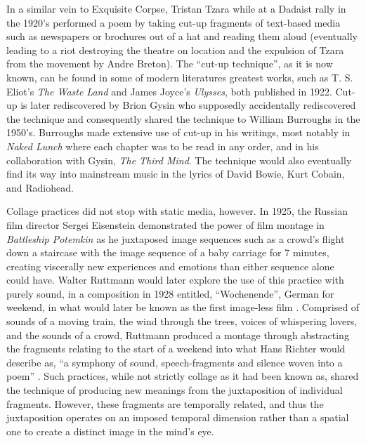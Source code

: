 \documentclass[a4paper,10pt,final]{ThesisStyle}
\begin{document}
In a similar vein to Exquisite Corpse, Tristan Tzara while at a Dadaist rally in the 1920's performed a poem by taking cut-up fragments of text-based media such as newspapers or brochures out of a hat and reading them aloud (eventually leading to a riot destroying the theatre on location and the expulsion of Tzara from the movement by Andre Breton).  The ``cut-up technique'', as it is now known, can be found in some of modern literatures greatest works, such as T. S. Eliot's \textit{The Waste Land} and James Joyce's \textit{Ulysses}, both published in 1922.  Cut-up is later rediscovered by Brion Gysin who supposedly accidentally rediscovered the technique and consequently shared the technique to William Burroughs in the 1950's.  Burroughs made extensive use of cut-up in his writings, most notably in \textit{Naked Lunch} where each chapter was to be read in any order, and in his collaboration with Gysin, \textit{The Third Mind}.  The technique would also eventually find its way into mainstream music in the lyrics of David Bowie, Kurt Cobain, and Radiohead.  %

Collage practices did not stop with static media, however.  In 1925, the Russian film director Sergei Eisenstein demonstrated the power of film montage in \textit{Battleship Potemkin} as he juxtaposed image sequences such as a crowd's flight down a staircase with the image sequence of a baby carriage for 7 minutes, creating viscerally new experiences and emotions than either sequence alone could have.  Walter Ruttmann would later explore the use of this practice with purely sound, in a composition in 1928 entitled, ``Wochenende'', German for weekend, in what would later be known as the first image-less film \cite{DouglasKahn1994}. Comprised of sounds of a moving train, the wind through the trees, voices of whispering lovers, and the sounds of a crowd, Ruttmann produced a montage through abstracting the fragments relating to the start of a weekend into what Hans Richter would describe as, ``a symphony of sound, speech-fragments and silence woven into a poem'' \cite{Ltd}.  Such practices, while not strictly collage as it had been known as, shared the technique of producing new meanings from the juxtaposition of individual fragments.  However, these fragments are temporally related, and thus the juxtaposition operates on an imposed temporal dimension rather than a spatial one to create a distinct image in the mind's eye.  
\end{document}
